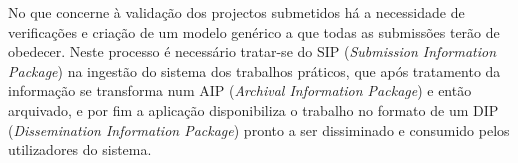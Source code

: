 No que concerne à validação dos projectos submetidos há a necessidade de verificações e 
criação de um modelo genérico a que todas as submissões terão de obedecer. Neste processo
é necessário tratar-se do SIP (\textit{Submission Information Package}) na ingestão do sistema dos
trabalhos práticos, que após tratamento da informação se transforma num AIP (\textit{Archival 
Information Package}) e então arquivado, e por fim a aplicação disponibiliza o trabalho no formato
de um DIP (\textit{Dissemination Information Package}) pronto a ser dissiminado e consumido pelos
utilizadores do sistema.